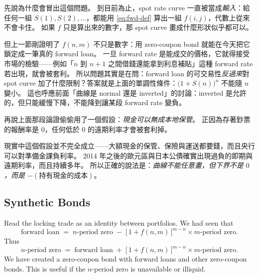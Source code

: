 \begin{remark}
	先說為什麼會冒出這個問題。
	到目前為止，spot rate curve 一直被當成\emph{輸入}：給任何一組 $S(1),S(2),\ldots$，都能用 \eqref{eq:fwd-def} 算出一組 $f(i,j)$，代數上從來不會卡住。
	如果 $f$ 只是算出來的數字，那 spot curve 畫成什麼形狀似乎都可以。

	但上一節剛證明了 $f(n,m)$ 不只是數字：用 zero-coupon bond 就能在今天把它鎖定成一筆真的 forward loan。
	一旦 forward rate 是能成交的價格，它就得接受市場的檢驗——例如「$n$ 到 $n+1$ 之間借錢還能拿到利息補貼」這種 forward rate 若出現，就會被套利。
	所以問題其實是在問：forward loan 的可交易性\emph{反過來}對 spot curve 加了什麼限制？答案就是上面的單調性條件：$\bigl(1+S(n)\bigr)^{n}$ 不能隨 $n$ 變小。
	這也呼應前面「曲線是 normal 還是 inverted」的討論：inverted 是允許的，但只能緩慢下降，不能降到讓某段 forward rate 變負。

	再說上面那段論證偷偷用了一個假設：\emph{現金可以無成本地保管}。
	正因為存著鈔票的報酬率是 $0$，任何低於 $0$ 的遠期利率才會被套利掉。

	現實中這個假設並不完全成立——大額現金的保管、保險與運送都要錢，而且央行可以對準備金課負利率。
	2014 年之後的歐元區與日本公債確實出現過負的即期與遠期利率，而且持續多年。
	所以正確的說法是：\emph{曲線不能任意畫，但下界不是 $0$，而是 $-(\text{持有現金的成本})$}。
\end{remark}
\suppend

\subsection{Synthetic Bonds}
\label{sec:synthetic-bonds}


Read the locking trade as an identity between portfolios.
We had seen that
\[
	\text{forward loan} \;=\; n\text{-period zero} \;-\; \bigl[\,1+f(n,m)\,\bigr]^{m-n}\times m\text{-period zero} .
\]
Thus
\[
	n\text{-period zero} \;=\; \text{forward loan} \;+\; \bigl[\,1+f(n,m)\,\bigr]^{m-n}\times m\text{-period zero} .
\]
We have created a  zero-coupon bond with forward loans and other zero-coupon bonds.
This is useful if the $n$-period zero is unavailable or illiquid.

